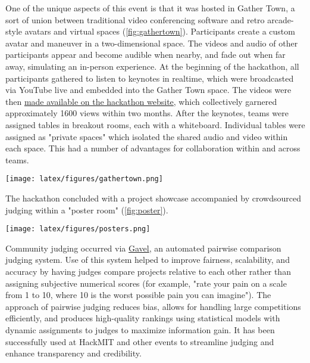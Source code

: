 \documentclass[superscriptaddress, nofootinbib,  amsmath, amssymb, twocolumn]{revtex4-2} %
\begin{document}
One of the unique aspects of this event is that it was hosted in Gather Town, a sort of union between traditional video conferencing software and retro arcade-style avatars and virtual spaces (\cref{fig:gathertown}). Participants create a custom avatar and maneuver in a two-dimensional space. The videos and audio of other participants appear and become audible when nearby, and fade out when far away, simulating an in-person experience. At the beginning of the hackathon, all participants gathered to listen to keynotes in realtime, which were broadcasted via YouTube live and embedded into the Gather Town space. The videos were then \href{https://ac-bo-hackathon.github.io/videos-slides/}{made available on the hackathon website}, which collectively garnered approximately 1600 views within two months. After the keynotes, teams were assigned tables in breakout rooms, each with a whiteboard. Individual tables were assigned as "private spaces" which isolated the shared audio and video within each space. This had a number of advantages for collaboration within and across teams.

\begin{figure*}
    \centering
    \texttt{[image: latex/figures/gathertown.png]}
    \caption{Gather town \href{https://ac-bo-hackathon.github.io/videos-slides/}{keynote} room (left), custom avatars (top-right), and an example of a breakout room for teams (bottom-right). Keynotes were broadcasted in realtime to participants via an embedded YouTube livestream. Use of Gather Town helped level the playing field for teams who were in physically separate locations and made it easier for facilitators and other teams to have more natural "check-ins" with other projects.}
    \label{fig:gathertown}
\end{figure*}


The hackathon concluded with a project showcase accompanied by crowdsourced judging within a "poster room" (\cref{fig:poster}).

\begin{figure*}
    \centering
    \texttt{[image: latex/figures/posters.png]}
    \caption{The synchronous portion of the hackathon concluded with a poster session and community judging. One participant noted that "it almost felt like a real poster session."}
    \label{fig:poster}
\end{figure*}

Community judging occurred via \href{https://github.com/anishathalye/gavel}{Gavel}, an automated pairwise comparison judging system. Use of this system helped to improve fairness, scalability, and accuracy by having judges compare projects relative to each other rather than assigning subjective numerical scores (for example, "rate your pain on a scale from 1 to 10, where 10 is the worst possible pain you can imagine"). The approach of pairwise judging reduces bias, allows for handling large competitions efficiently, and produces high-quality rankings using statistical models with dynamic assignments to judges to maximize information gain. It has been successfully used at HackMIT and other events to streamline judging and enhance transparency and credibility.
\end{document}
